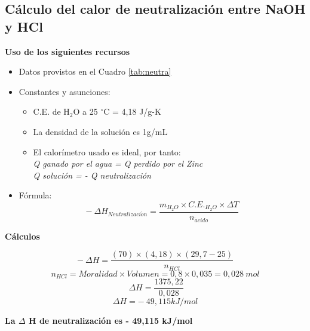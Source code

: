 \documentclass[10pt]{article}
\begin{document}
\subsection{Cálculo del calor de neutralización entre NaOH y HCl}
   \vspace{2mm}
\textbf{Uso de los siguientes recursos}
    \begin{itemize}
        \item Datos provistos en el Cuadro \ref{tab:neutra}
        \item Constantes y asunciones:
        \begin{itemize}
            \item C.E. de H$_{2}$O a 25 $^\circ$C = 4,18 J/g-K
            \item La densidad de la solución es 1g/mL
            \item El calorímetro usado es ideal, por tanto:\\ 
                \emph{Q ganado por el agua = Q perdido por el Zinc}\\ \emph{Q solución = - Q neutralización}
        \end{itemize}
        \item Fórmula:
        \begin{equation}
           - ~ \Delta H_{Neutralizaci\acute{o}n} = \frac{m_{H_{2}O} \times C.E._{H_{2}O} \times\Delta T}{n_{\acute{a}cido}} 
        \end{equation}

    \end{itemize}
\vspace{2mm}
\hspace{0.5cm}\textbf{Cálculos}

\begin{equation*}
           - ~ \Delta H = \frac{(70)\times(4,18)\times(29,7-25)}{n_{HCl}}
        \end{equation*}
\vspace{0.1cm}
\begin{equation*}
            n_{HCl} = Moralidad \times Volumen = 0,8 \times 0,035 = 0,028 ~ mol
        \end{equation*}
 \vspace{0.1cm}       
\begin{equation*}
             ~ \Delta H = \frac{1375,22} {0,028}
        \end{equation*}
\vspace{0.1cm}
\begin{equation*}
           \Delta H = - ~ 49,115 kJ/mol
        \end{equation*}
\begin{center}
    \textbf{La $\Delta$ H de neutralización es - 49,115 kJ/mol}
\end{center}
\end{document}
